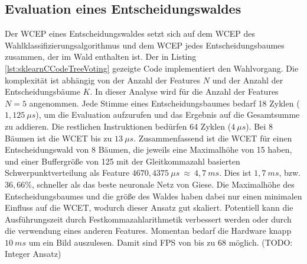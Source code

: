 \subsection{Evaluation eines Entscheidungswaldes}
Der WCEP eines Entscheidungswaldes setzt sich auf dem WCEP des Wahlklassifizierungsalgorithmus und dem WCEP jedes Entscheidungsbaumes zusammen, der im Wald enthalten ist.
\newline
\newline
Der in Listing \ref{lst:sklearnCCodeTreeVoting} gezeigte Code implementiert den Wahlvorgang. Die komplexität ist abhängig von der Anzahl der Features $N$ und der Anzahl der Entscheidungsbäume $K$. In
dieser Analyse wird für die Anzahl der Features $N=5$ angenommen.
\newline
\newline
Jede Stimme eines Entscheidungsbaumes bedarf 18 Zyklen ($1,125\ \mu s$), um die Evaluation aufzurufen und das Ergebnis auf die Gesamtsumme zu addieren. Die restlichen Instruktionen bedürfen 64 Zyklen
($4\ \mu s$). Bei 8 Bäumen ist die WCET bis zu $13\ \mu s$.
\newline
\newline
Zusammenfassend ist die WCET für einen Entscheidungswald von 8 Bäumen, die jeweils eine Maximalhöhe von 15 haben, und einer Buffergröße von 125 mit der Gleitkommazahl basierten Schwerpunktverteilung als Feature
$4670,4375\ \mu s\ \approx\ 4,7\ ms$. Dies ist $1,7\ ms$, bzw. $36,66\%$, schneller als das beste neuronale Netz von Giese. Die Maximalhöhe des Entscheidungsbaumes und die größe des Waldes haben dabei nur
einen minimalen Einfluss auf die WCET, wodurch dieser Ansatz gut skaliert.
\newline
\newline
Potentiell kann die Ausführungszeit durch Festkommazahlarithmetik verbessert werden oder durch die verwendung eines anderen Features. Momentan bedarf die Hardware knapp $10\ ms$ um ein Bild auszulesen. Damit
sind FPS von bis zu 68 möglich. (TODO: Integer Ansatz)